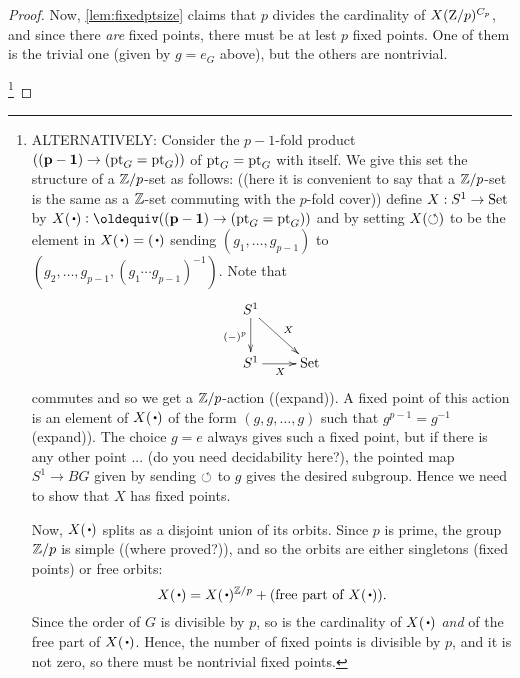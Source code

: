 \begin{proof}
 Now, \cref{lem:fixedptsize} claims that $p$ divides the cardinality of $X(\mathrm{Z}/p)^{C_p}$, and since there \emph{are} fixed points, there must be at lest $p$ fixed points.  One of them is the trivial one (given by $g=e_G$ above), but the others are nontrivial.


\footnote{ALTERNATIVELY:
  Consider  the $p-1$-fold product $(\mathbf{(p-1)}\to ({\mathord{\mathrm{pt}}}_G={\mathord{\mathrm{pt}}}_G))$ of ${\mathord{\mathrm{pt}}}_G={\mathord{\mathrm{pt}}}_G$ with itself.  We give this set the structure of a $\mathbb{Z}/p$-set as follows: ((here it is convenient to say that a $\mathbb{Z}/p$-set is the same as a $\mathbb{Z}$-set commuting with the $p$-fold cover)) define $X:S^1\to\mathord{\mathrm{Set}}$ by $X(\base)\defequi (\bn{(p-1)}\to (\pt_G=\pt_G))$ and by setting $X(\circlearrowleft)$ to be the element in $X(\base)=(\base)$ sending $(g_1,\dots,g_{p-1})$ to $(g_2,\dots,g_{p-1},(g_1\cdots g_{p-1})^{-1})$.  Note that
$$\xymatrix{S^1\ar[d]_{(-)^p}\ar[dr]^X&\\S^1\ar[r]_X&\Set}$$
commutes and so we get a $\mathbb{Z}/p$-action ((expand)).  A fixed point of this action is an element of $X(\base)$ of the form $(g,g,\dots,g)$ such that $g^{p-1}=g^{-1}$  (expand)). The choice $g=e$ always gives such a fixed point, but if there is any other point ... (do you need decidability here?), the pointed map $S^1\to BG$ given by sending $\circlearrowleft$ to $g$ gives the desired subgroup. Hence we need to show that $X$ has fixed points.

Now, $X(\base)$ splits as a disjoint union of its orbits.  Since $p$ is prime, the group $\mathbb{Z}/p$ is simple ((where proved?)), and so the orbits are either singletons (fixed points) or free orbits:
$$X(\base)= X(\base)^{\ZZ/p}+(\text{free part of }X(\base)).$$
Since the order of $G$ is divisible by $p$, so is the cardinality of $X(\base)$ \emph{and} of the free part of $X(\base)$.  Hence, the number of fixed points is divisible by $p$, and it is not zero, so there must be nontrivial fixed points.


}
\end{proof}
